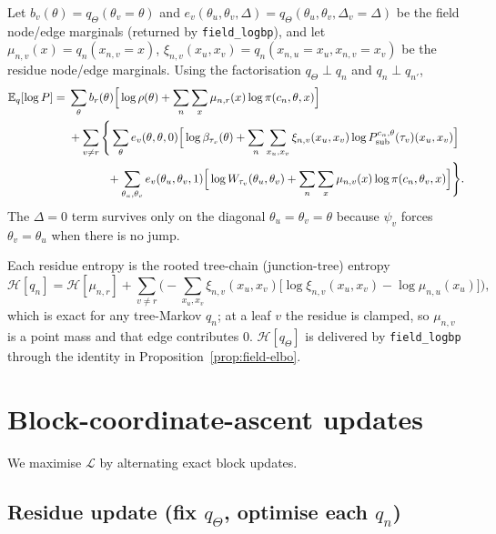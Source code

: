 \documentclass[11pt]{article}
\newcommand{\Eq}[2]{\mathbb{E}_{#1}\!\left[#2\right]}
\newcommand{\Ent}[1]{\mathcal{H}\!\left[#1\right]}
\newcommand{\Psub}{P_{\mathrm{sub}}}
\begin{document}
Let $b_v(\theta)=q_\Theta(\theta_v{=}\theta)$ and
$e_v(\theta_u,\theta_v,\Delta)=q_\Theta(\theta_u,\theta_v,\Delta_v{=}\Delta)$
be the field node/edge marginals (returned by \texttt{field\_logbp}), and let
$\mu_{n,v}(x)=q_n(x_{n,v}{=}x)$, $\xi_{n,v}(x_u,x_v)=q_n(x_{n,u}{=}x_u,x_{n,v}{=}x_v)$
be the residue node/edge marginals. Using the factorisation
$q_\Theta\!\perp\! q_n$ and $q_n\!\perp\! q_{n'}$,
\begin{align}
\Eq{q}{\log P}
  =\;& \sum_\theta b_r(\theta)\Big[\log\rho(\theta)
        + \sum_n\sum_x \mu_{n,r}(x)\log\pi(c_n,\theta,x)\Big]
        \label{eq:ElogP-root}\\
  &+\sum_{v\neq r}\Bigg\{
     \sum_\theta e_v(\theta,\theta,0)\Big[\log\beta_{\tau_v}(\theta)
        + \sum_n\sum_{x_u,x_v}\xi_{n,v}(x_u,x_v)\log\Psub^{c_n,\theta}(\tau_v)(x_u,x_v)\Big]
        \nonumber\\
  &\hphantom{+\sum_{v\neq r}\Bigg\{}
   + \sum_{\theta_u,\theta_v} e_v(\theta_u,\theta_v,1)\Big[\log W_{\tau_v}(\theta_u,\theta_v)
        + \sum_n\sum_{x}\mu_{n,v}(x)\log\pi(c_n,\theta_v,x)\Big]\Bigg\}.
        \label{eq:ElogP-edge}
\end{align}
The $\Delta{=}0$ term survives only on the diagonal $\theta_u{=}\theta_v{=}\theta$
because $\psi_v$ forces $\theta_v{=}\theta_u$ when there is no jump.

Each residue entropy is the rooted tree-chain (junction-tree) entropy
\begin{equation}
\Ent{q_n} = \Ent{\mu_{n,r}} + \sum_{v\neq r}
  \Big(-\!\!\sum_{x_u,x_v}\!\xi_{n,v}(x_u,x_v)
        \big[\log\xi_{n,v}(x_u,x_v)-\log\mu_{n,u}(x_u)\big]\Big),
\label{eq:Hqn}
\end{equation}
which is exact for any tree-Markov $q_n$; at a leaf $v$ the residue is clamped,
so $\mu_{n,v}$ is a point mass and that edge contributes $0$.
$\Ent{q_\Theta}$ is delivered by \texttt{field\_logbp} through the identity in
Proposition~\ref{prop:field-elbo}.

\section{Block-coordinate-ascent updates}

We maximise $\mathcal L$ by alternating exact block updates.

\subsection{Residue update (fix $q_\Theta$, optimise each $q_n$)}
\label{sec:res-update}
\end{document}
